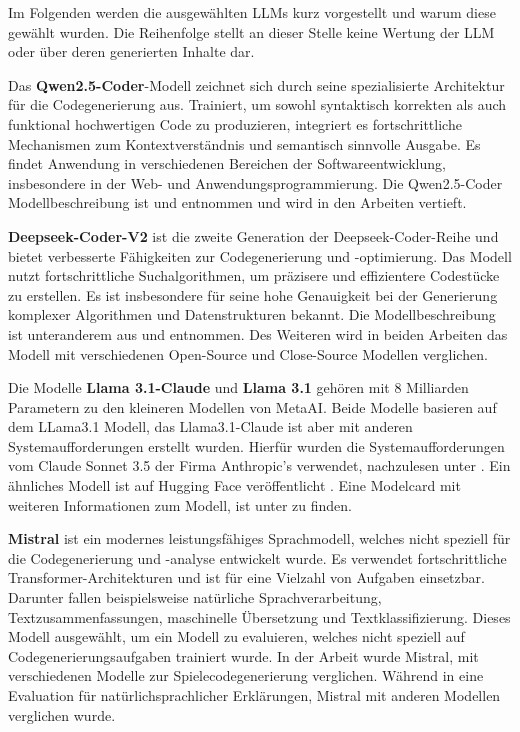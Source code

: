 Im Folgenden werden die ausgewählten LLMs kurz vorgestellt und warum diese gewählt wurden. Die Reihenfolge stellt an dieser Stelle keine Wertung der LLM oder über deren generierten Inhalte dar.\vspace{0.2cm}

Das \textbf{Qwen2.5-Coder}-Modell zeichnet sich durch seine spezialisierte Architektur für die Codegenerierung aus. Trainiert, um sowohl syntaktisch korrekten als auch funktional hochwertigen Code zu produzieren, integriert es fortschrittliche Mechanismen zum Kontextverständnis und semantisch sinnvolle Ausgabe. Es findet Anwendung in verschiedenen Bereichen der Softwareentwicklung, insbesondere in der Web- und Anwendungsprogrammierung. Die Qwen2.5-Coder Modellbeschreibung ist \cite{qwen-2024} und \cite{hui-2024} entnommen und wird in den Arbeiten vertieft.\vspace{0.2cm}

\textbf{Deepseek-Coder-V2} ist die zweite Generation der Deepseek-Coder-Reihe und bietet verbesserte Fähigkeiten zur Codegenerierung und -optimierung. Das Modell nutzt fortschrittliche Suchalgorithmen, um präzisere und effizientere Codestücke zu erstellen. Es ist insbesondere für seine hohe Genauigkeit bei der Generierung komplexer Algorithmen und Datenstrukturen bekannt. Die Modellbeschreibung ist unteranderem aus \cite{deepseek-ai-2024} und \cite{cui-2024} entnommen. Des Weiteren wird in beiden Arbeiten das Modell mit verschiedenen Open-Source und Close-Source Modellen verglichen.\vspace{0.2cm} 

Die Modelle \textbf{Llama 3.1-Claude} und \textbf{Llama 3.1} gehören mit 8 Milliarden Parametern zu den kleineren Modellen von MetaAI. Beide Modelle basieren auf dem LLama3.1 Modell, das Llama3.1-Claude ist aber mit anderen Systemaufforderungen erstellt wurden. Hierfür wurden die Systemaufforderungen vom Claude Sonnet 3.5 der Firma Anthropic’s verwendet, nachzulesen unter \cite{ollama_page_llama31_claude}. Ein ähnliches Modell ist auf Hugging Face veröffentlicht \cite{huggingface_page_llama31_claude}. Eine Modelcard mit weiteren Informationen zum Modell, ist unter \cite{meta-llama-no-date} zu finden.\vspace{0.2cm}

\textbf{Mistral} ist ein modernes leistungsfähiges Sprachmodell, welches nicht speziell für die Codegenerierung und -analyse entwickelt wurde. Es verwendet fortschrittliche Transformer-Architekturen und ist für eine Vielzahl von Aufgaben einsetzbar. Darunter fallen beispielsweise natürliche Sprachverarbeitung, Textzusammenfassungen, maschinelle Übersetzung und Textklassifizierung. Dieses Modell ausgewählt, um ein Modell zu evaluieren, welches nicht speziell auf Codegenerierungsaufgaben trainiert wurde. In der Arbeit \cite{eberhardinger-2024} wurde Mistral, mit verschiedenen Modelle zur Spielecodegenerierung verglichen. Während in \cite{quan-2024} eine Evaluation für natürlichsprachlicher Erklärungen, Mistral mit anderen Modellen verglichen wurde.\vspace{0.2cm}

